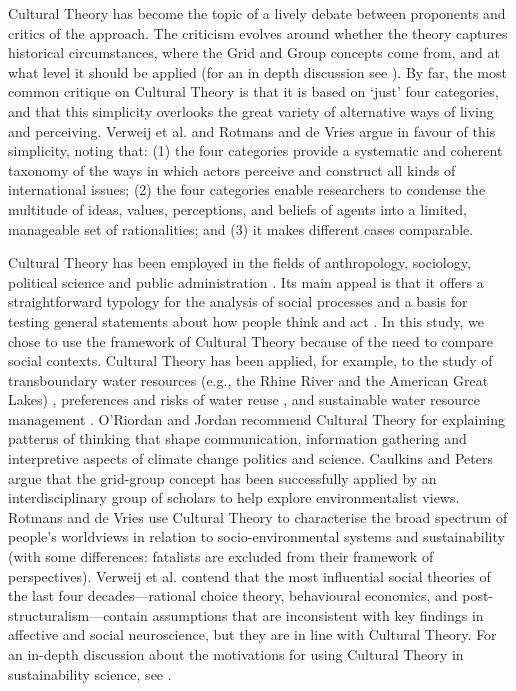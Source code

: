 \documentclass[12pt, a4paper]{article}
\begin{document}
Cultural Theory has become the topic of a lively debate between proponents and critics of the approach. The criticism evolves around whether the theory captures historical circumstances, where the Grid and Group concepts come from, and at what level it should be applied (for an in depth discussion see \autocite{Verweij:2000tx}). By far, the most common critique on Cultural Theory is that it is based on ‘just’ four categories, and that this simplicity overlooks the great variety of alternative ways of living and perceiving. Verweij et al.\autocite{Verweij:2000tx} and Rotmans and de Vries \autocite{Rotmans:1997td} argue in favour of this simplicity, noting that: (1) the four categories provide a systematic and coherent taxonomy of the ways in which actors perceive and construct all kinds of international issues; (2) the four categories enable researchers to condense the multitude of ideas, values, perceptions, and beliefs of agents into a limited, manageable set of rationalities; and (3) it makes different cases comparable.

Cultural Theory has been employed in the fields of anthropology, sociology, political science and public administration \autocite{Verweij:2000tx}. Its main appeal is that it offers a straightforward typology for the analysis of social processes and a basis for testing general statements about how people think and act \autocite{Verweij:2015cr}. In this study, we chose to use the framework of Cultural Theory because of the need to compare social contexts. Cultural Theory has been applied, for example, to the study of transboundary water resources (e.g., the Rhine River and the American Great Lakes) \autocite{Verweij:2000tx}, preferences and risks of water reuse \autocite{Hoekstra:2000il}, and sustainable water resource management \autocite{Offermans:2011ja}. O'Riordan and Jordan \autocite{ORiordan:1999ko} recommend Cultural Theory for explaining patterns of thinking that shape communication, information gathering and interpretive aspects of climate change politics and science. Caulkins and Peters \autocite{Caulkins:1999fz} argue that the grid-group concept has been successfully applied by an interdisciplinary group of scholars to help explore environmentalist views. Rotmans and de Vries \autocite{Rotmans:1997td} use Cultural Theory to characterise the broad spectrum of people’s worldviews in relation to socio-environmental systems and sustainability (with some differences: fatalists are excluded from their framework of perspectives). Verweij et al.\autocite{Verweij:2015cr} contend that the most influential social theories of the last four decades—rational choice theory, behavioural economics, and post-structuralism—contain assumptions that are inconsistent with key findings in affective and social neuroscience, but they are in line with Cultural Theory. For an in-depth discussion about the motivations for using Cultural Theory in sustainability science, see \autocite{Rotmans:1997td}.
\end{document}
